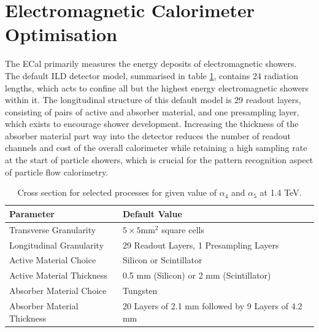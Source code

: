 \section{Electromagnetic Calorimeter Optimisation}
\label{sec:ecal}
The ECal primarily measures the energy deposits of electromagnetic showers.  The default ILD detector model, summarised in table \ref{table:defaultildecal}, contains 24 radiation lengths, which acts to confine all but the highest energy electromagnetic showers within it.  The longitudinal structure of this default model is 29 readout layers, consisting of pairs of active and absorber material, and one presampling layer, which exists to encourage shower development.  Increasing the thickness of the absorber material part way into the detector reduces the number of readout channels and cost of the overall calorimeter while retaining a high sampling rate at the start of particle showers, which is crucial for the pattern recognition aspect of particle flow calorimetry.  

\begin{table}[h!]
\centering
\begin{tabular}{ l l}
\hline
Parameter & Default Value \\
\hline
Transverse Granularity & $5 \times 5 \text{mm}^{2}$ square cells \\
Longitudinal Granularity & 29 Readout Layers, 1 Presampling Layers \\
Active Material Choice & Silicon or Scintillator  \\
Active Material Thickness & 0.5 mm (Silicon) or 2 mm (Scintillator)  \\
Absorber Material Choice & Tungsten \\
Absorber Material Thickness & 20 Layers of 2.1 mm followed by 9 Layers of 4.2 mm \\
\hline
\end{tabular}
\caption{Cross section for selected processes for given value of $\alpha_{4}$ and $\alpha_{5}$ at 1.4 TeV.}
\label{table:defaultildecal}
\end{table}

